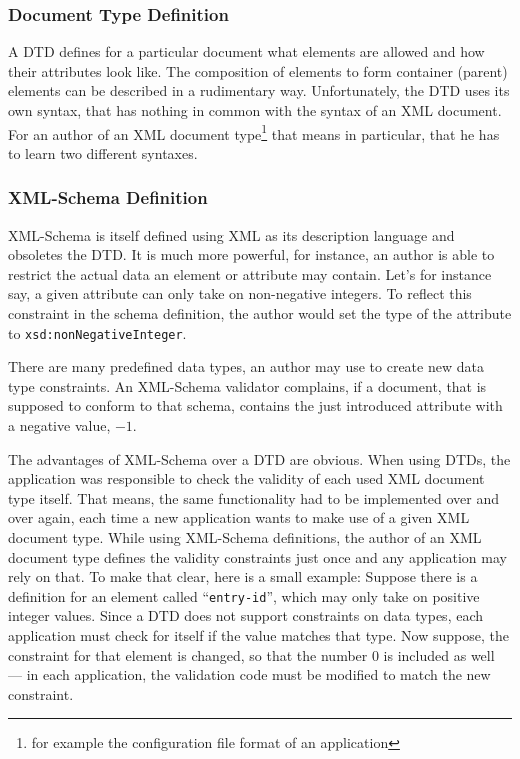 \subsubsection{Document Type Definition}

A DTD defines for a particular  document what elements are allowed and how
their attributes look like. The  composition of elements to form container
(\ie parent)   elements  can   be   described  in   a  rudimentary   way.
Unfortunately, the  DTD uses  its own syntax,  that has nothing  in common
with  the syntax of  an XML  document. For  an author  of an  XML document
type\footnote{for example the configuration file format of an application}
that means in particular, that he has to learn two different syntaxes.

\subsubsection{XML-Schema Definition}

XML-Schema is  itself defined  using XML as  its description  language and
obsoletes the  DTD. It is much  more powerful, for instance,  an author is
able  to   restrict  the   actual  data  an   element  or   attribute  may
contain.  Let's for  instance  say, a  given  attribute can  only take  on
non-negative  integers.    To  reflect  this  constraint   in  the  schema
definition,  the   author  would  set   the  type  of  the   attribute  to
\texttt{xsd:nonNegativeInteger}.

There are many predefined data types, an author may use to create new data
type constraints.  An XML-Schema validator complains, if  a document, that
is  supposed to  conform  to  that schema,  contains  the just  introduced
attribute with a negative value, \eg $-1$.

The advantages of XML-Schema over a DTD are obvious.  When using DTDs, the
application  was  responsible to  check  the  validity  of each  used  XML
document  type  itself. That  means,  the  same  functionality had  to  be
implemented over and over again, \ie each time a new application wants to
make use of a given XML document type. While using XML-Schema definitions,
the author of  an XML document type defines  the validity constraints just
once and any application  may rely on that. To make that  clear, here is a
small  example:  Suppose there  is  a  definition  for an  element  called
``\texttt{entry-id}'',  which may  only take  on positive  integer values.
Since a DTD  does not support constraints on  data types, each application
must check  for itself if  the value matches  that type. Now  suppose, the
constraint  for  that  element is  changed,  so  that  the number  $0$  is
included as  well ---  in each application,  the validation code  must be
modified to match the new constraint.

